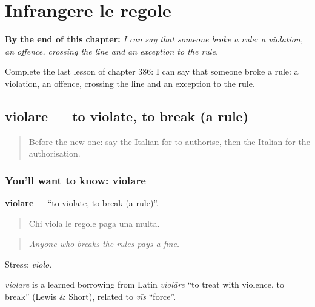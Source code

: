 
\chapter{Infrangere le regole}
\label{ch:it-infrangere-le-regole}

\begin{chapteropening}
\textbf{By the end of this chapter:} \emph{I can say that someone broke a rule: a violation, an offence, crossing the line and an exception to the rule.}

Complete the last lesson of chapter 386: I can say that someone broke a rule: a violation, an offence, crossing the line and an exception to the rule.
\end{chapteropening}

\section[violare]{violare — to violate, to break (a rule)}

\label{lesson:IT-C386-violare}



\begin{quote}
Before the new one: say the Italian for to authorise, then the Italian for the authorisation.
\end{quote}

\subsection*{You'll want to know: violare}
\textbf{violare} — \textquotedblleft{}to violate, to break (a rule)\textquotedblright{}.

\begin{quote}
Chi viola le regole paga una multa.
\end{quote}

\begin{quote}
\emph{Anyone who breaks the rules pays a fine.}
\end{quote}

Stress: \emph{vìolo}.

\begin{cousinweb}
\emph{violare} is a learned borrowing from Latin \emph{violāre} \textquotedblleft{}to treat with violence, to break\textquotedblright{} (Lewis \& Short), related to \emph{vīs} \textquotedblleft{}force\textquotedblright{}.
\end{cousinweb}

